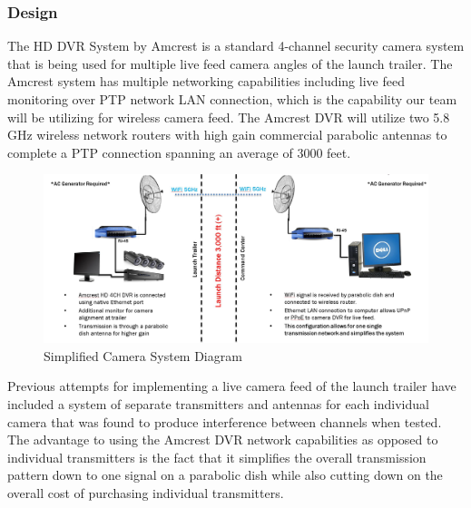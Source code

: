 \documentclass[10pt,a4paper]{article}
\begin{document}
\subsubsection{Design}
The HD DVR System by Amcrest is a standard 4-channel security camera system that is being used for multiple live feed camera angles of the launch trailer. The Amcrest system has multiple networking capabilities including live feed monitoring over PTP network LAN connection, which is the capability our team will be utilizing for wireless camera feed. The Amcrest DVR will utilize two 5.8 GHz wireless network routers with high gain commercial parabolic antennas to complete a PTP connection spanning an average of 3000 feet.\\
\begin{figure}[h!]
	\centering
	\includegraphics[width=1\textwidth]{./figs/CameraSystemSetup.jpg}
	\caption{Simplified Camera System Diagram}
	\label{fig:example}
\end{figure}
Previous attempts for implementing a live camera feed of the launch trailer have included a system of separate transmitters and antennas for each individual camera that was found to produce interference between channels when tested. The advantage to using the Amcrest DVR network capabilities as opposed to individual transmitters is the fact that it simplifies the overall transmission pattern down to one signal on a parabolic dish while also cutting down on the overall cost of purchasing individual transmitters.
\end{document}
